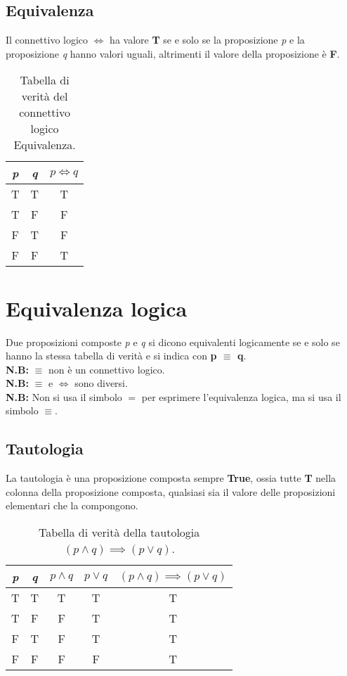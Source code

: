 \subsection{Equivalenza}
Il connettivo logico \textbf{$\iff$} ha valore \textbf{T} se e solo se la proposizione \textit{p} e la proposizione \textit{q} hanno valori uguali, altrimenti il valore della proposizione è \textbf{F}.

\begin{table}[H]
    \centering
    \caption{\label{tab:true_table_iff}Tabella di verità del connettivo logico Equivalenza.}
    \begin{tabular}{|c | c || c ||} 
     \hline
     \textit{p} & \textit{q} & $p \iff q$ \\
     \hline\hline
     T & T & T \\ 
     \hline
     T & F & F \\
     \hline
     F & T & F \\
     \hline
     F & F & T \\
     \hline
    \end{tabular}
\end{table}

\section{Equivalenza logica}
Due proposizioni composte \textit{p} e \textit{q} si dicono equivalenti logicamente se e solo se hanno la stessa tabella di verità e si indica con \textbf{p $\equiv$ q}.\\
\textbf{N.B:} $\equiv$ non è un connettivo logico. \\
\textbf{N.B:} $\equiv$ e $\iff$ sono diversi. \\
\textbf{N.B:} Non si usa il simbolo $=$ per esprimere l'equivalenza logica, ma si usa il simbolo $\equiv$.

\subsection{Tautologia}
La tautologia è una proposizione composta sempre \textbf{True}, ossia tutte \textbf{T} nella colonna della proposizione composta, qualsiasi sia il valore delle proposizioni elementari che la compongono. \\
\begin{table}[H]
    \centering    
    \caption{\label{tab:true_table_tautologia}Tabella di verità della tautologia $(p \wedge q) \implies (p \vee q)$.}
    \begin{tabular}{|c | c | c | c || c ||} 
     \hline
     \textit{p} & \textit{q} & $p \wedge q$ & $p \vee q$ & $(p \wedge q) \implies (p \vee q)$ \\
     \hline\hline
     T & T & T & T & T \\ 
     \hline
     T & F & F & T & T \\
     \hline
     F & T & F & T & T \\
     \hline
     F & F & F & F & T \\
     \hline
    \end{tabular}
\end{table}

